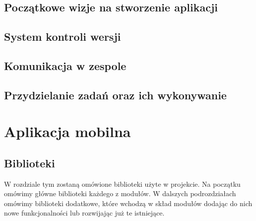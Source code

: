\documentclass[a4paper,twoside,12pt]{book}
\begin{document}
\section{Początkowe wizje na stworzenie aplikacji}

\section{System kontroli wersji}

\section{Komunikacja w zespole}

\section{Przydzielanie zadań oraz ich wykonywanie}


 


\chapter{Aplikacja mobilna}
\label{ch:05}


%      




\section{Biblioteki}
W rozdziale tym zostaną omówione biblioteki użyte w projekcie. Na początku omówimy główne biblioteki każdego z modułów. W dalszych podrozdziałach omówimy biblioteki dodatkowe, które wchodzą w skład modułów dodając do nich nowe funkcjonalności lub rozwijając już te istniejące.
\end{document}
